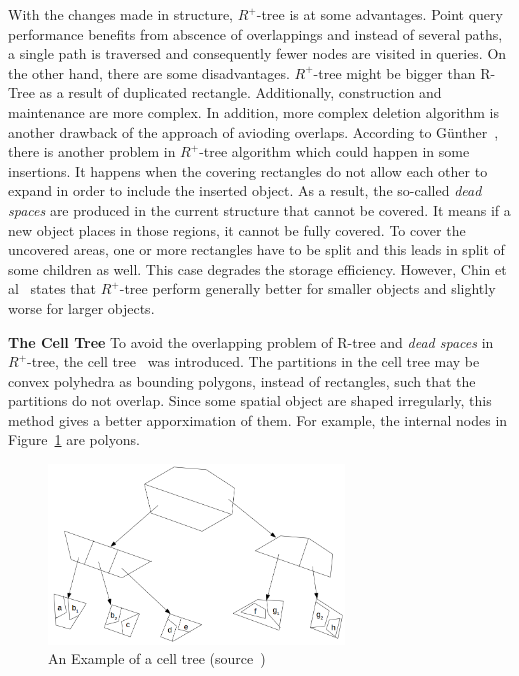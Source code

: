 \documentclass[a4paper,12pt]{article}
\begin{document}
With the changes made in structure, {$R^+$-tree} is at some advantages. Point query performance benefits from abscence of overlappings and instead of several paths, a single path is traversed and consequently fewer nodes are visited in queries. On the other hand, there are some disadvantages. 
{$R^+$-tree} might be bigger than R-Tree as a result of duplicated rectangle. Additionally, construction and maintenance are more complex. In addition, more complex deletion algorithm is another drawback of the approach of avioding overlaps.  
According to Günther~\cite{efficientstruct}, there is another problem in {$R^+$-tree} algorithm which could happen in some insertions. It happens when the covering rectangles do not allow each other to expand in order to include the inserted object. As a result, the so-called \textit{dead spaces} are produced in the current structure that cannot be covered. It means if a new object places in those regions, it cannot be fully covered. To cover the uncovered areas, one or more rectangles have to be split and this leads in split of some children as well. This case degrades the storage efficiency. However, Chin et al~\cite{survey} states that {$R^+$-tree} perform generally better for smaller objects and slightly worse for larger objects.

\textbf{The Cell Tree}
To avoid the overlapping problem of R-tree and \textit{dead spaces} in $R^+$-tree, the cell tree~\cite{celltree} was introduced. The partitions in the cell tree may be convex polyhedra as bounding polygons, instead of rectangles, such that the partitions do not overlap. 
Since some spatial object are shaped irregularly, this method gives a better apporximation of them.
For example, the internal nodes in Figure~\ref{figcelltree} are polyons. 
\begin{figure}
\centering
\includegraphics[width=0.7\textwidth]{CellTree}
\caption{An Example of a cell tree (source~\cite{survey})}
\label{figcelltree}
\end{figure} 
\end{document}
